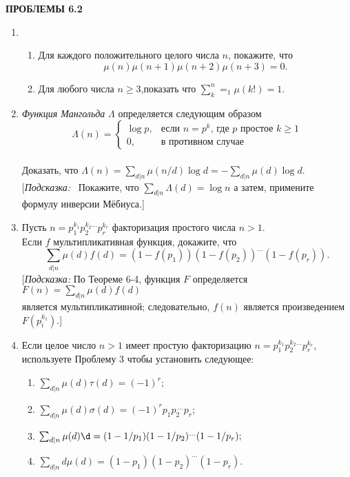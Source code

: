 \documentclass[11pt]{article}
\begin{document}
	\begin{center}
	\LARGE {\textsf {\textbf {ПРОБЛЕМЫ 6.2}}}\\[5mm]
\end{center}
\begin{enumerate}
\item 	\begin{enumerate}
\item Для каждого положительного целого числа $n$, покажите, что\\
$$\mu(n)\mu(n+1)\mu(n+2)\mu(n+3)=0.$$
\item Для любого числа $n\ge3$,показать что
$\sum_k^n=_1\mu(k!)=1.$
\end{enumerate}
\item {\it Функция Мангольда} $\Lambda$ определяется следующим образом\\
$$\Lambda(n)=\begin{cases}
\log{p},&\text{если $n=p^k$, где $p$ простое $k\ge1$} \\
0,&\text{в противном случае}
\end{cases}$$\\
Доказать, что $\Lambda(n)=\sum_{d|n}\mu(n/d)\log{d}=-\sum_{d|n}\mu(d)\log{d}.$ [{\it Подсказка:} ~Покажите, что $\sum_{d|n}\Lambda(d)=\log{n}$ а затем, примените формулу инверсии Мёбиуса.]
\item Пусть $n=p_1^{k_1}p_2^{k_2\dots}p_r^{k_r}$ факторизация простого числа $n>1$.\\
 Если $f$ мультипликативная функция, докажите, что\\
$$\sum_{d|n}\mu(d)f(d)=(1-f(p_1))(1-f(p_2))^{\dots} (1-f(p_r)).$$
[{\itshape Подсказка:}\: По Теореме 6-4, функция $F$ определяется $F(n)=\sum_{d|n}\mu(d)f(d)$\\
 является мультипликативной; следовательно, $f(n)$ является произведением $F(p_i^{k_1})$.]
\item Если целое число $n>1$ имеет простую факторизацию $n=p_1^{k_1}p_2^{k_2\dots}p_r^{k_r}$, используете Проблему 3 чтобы установить следующее:
\begin{enumerate}
	\item $\sum_{d|n}\mu(d)\tau(d)=(-1)^r;$
	\setlength{\parskip}{3mm}
	\item $\sum_{d|n}\mu(d)\sigma(d)=(-1)^rp_1p_{2~} ^{~\dots}p_r;$
	\item $\sum_{d|n}\mu(d)\d=(1-1/p_1)(1-1/p_2)^{\dots}(1-1/p_r);$
	\item $\sum_{d|n}d\mu(d)=(1-p_1)(1-p_2)^{\dots}(1-p_r).$
\end{enumerate}

\end{enumerate}
\end{document}
